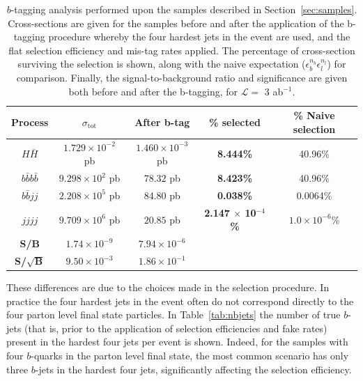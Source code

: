 \documentclass[12pt]{article}
\begin{document}
\begin{table}[h]
\begin{center}
\begin{tabular}{|c|c|c|c|c|}
\hline
Process & $\sigma_{\mathrm{tot}}$ & After b-tag & \% selected & \% Naive selection \\
\hline \hline
$H\bar{H}$ & $1.729 \times 10^{-2}$ pb & $1.460\times 10^{-3}$ pb & \textbf{8.444\%} & 40.96\% \\
\hline
$b\bar{b}b\bar{b}$ & $9.298 \times10^2$ pb & $78.32$ pb & \textbf{8.423\%} & 40.96\%\\
$b\bar{b}jj$ &  $2.208 \times 10^5$ pb & $84.80$ pb & \textbf{0.038\%} & 0.0064\% \\
$jjjj$ & $9.709\times 10^6$ pb & $20.85$ pb & \textbf{2.147 $\times$ 10$^{-4}$\%} & $1.0\times 10^{-6}$\%\\
\hline
\textbf{S/B} & $1.74 \times 10^{-9}$ & $7.94 \times 10^{-6}$& \multicolumn{2}{c}{}\\
\cline{1-3}
\textbf{S/$\sqrt{\mathrm{\textbf{B}}}$}& $9.50 \times 10^{-3}$ & $1.86 \times 10^{-1}$& \multicolumn{2}{c}{}\\
\cline{1-3}
\end{tabular}
\end{center}
\caption{$b$-tagging analysis performed upon the samples described in Section~\ref{sec:samples}. Cross-sections are given for the samples before and after the application of the b-tagging procedure whereby the four hardest jets in the event are used, and the flat selection efficiency and mis-tag rates applied. The percentage of cross-section surviving the selection is shown, along with the naive expectation ($\epsilon_b^{n_b}\epsilon_l^{n_l}$) for comparison. Finally, the signal-to-background ratio and significance are given both before and after the b-tagging, for $\mathcal{L}=$ 3 ab$^{-1}$.} \label{tab:btageff1}
\end{table}%

These differences are due to the choices made in the selection procedure. In practice the four hardest jets in the event often do not correspond directly to the four parton level final state particles. In Table~\ref{tab:nbjets} the number of true $b$-jets (that is, prior to the application of selection efficiencies and fake rates) present in the hardest four jets per event is shown. Indeed, for the samples with four $b$-quarks in the parton level final state, the most common scenario has only three $b$-jets in the hardest four jets, significantly affecting the selection efficiency.
\end{document}
